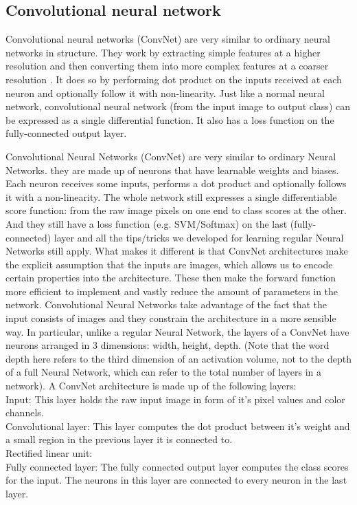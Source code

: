 \subsection{Convolutional neural network}
Convolutional neural networks (ConvNet) are very similar to ordinary neural networks in structure. They work by extracting simple features at a higher resolution and then converting them into more complex features at a coarser resolution \cite{simard2003best}. It does so by performing dot product on the inputs received at each neuron and optionally follow it with non-linearity. Just like a normal neural network, convolutional neural network (from the input image to output class) can be expressed as a single differential function. It also has a loss function on the fully-connected output layer.

Convolutional Neural Networks (ConvNet) are very similar to ordinary Neural Networks. they are made up of neurons that have learnable weights and biases. Each neuron receives some inputs, performs a dot product and optionally follows it with a non-linearity. The whole network still expresses a single differentiable score function: from the raw image pixels on one end to class scores at the other. And they still have a loss function (e.g. SVM/Softmax) on the last (fully-connected) layer and all the tips/tricks we developed for learning regular Neural Networks still apply. 
What makes it different is that ConvNet architectures make the explicit assumption that the inputs are images, which allows us to encode certain properties into the architecture. These then make the forward function more efficient to implement and vastly reduce the amount of parameters in the network. Convolutional Neural Networks take advantage of the fact that the input consists of images and they constrain the architecture in a more sensible way. In particular, unlike a regular Neural Network, the layers of a ConvNet have neurons arranged in 3 dimensions: width, height, depth. (Note that the word depth here refers to the third dimension of an activation volume, not to the depth of a full Neural Network, which can refer to the total number of layers in a network). 
A ConvNet architecture is made up of the following layers: \\
Input: This layer holds the raw input image in form of it's pixel values and color channels.\\
Convolutional layer: This layer computes the dot product between it's weight and a small region in the previous layer it is connected to.\\
Rectified linear unit: \\
Fully connected layer: The fully connected output layer computes the class scores for the input. The neurons in this layer are connected to every neuron in the last layer.\\

